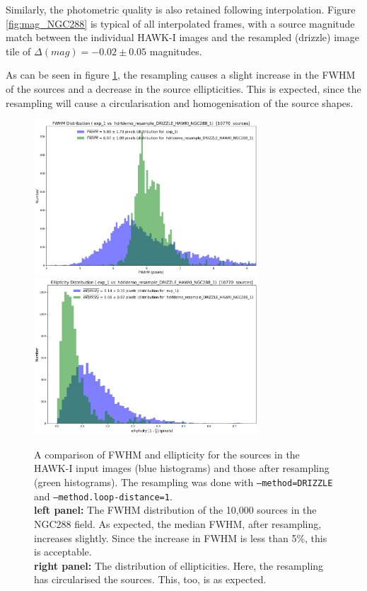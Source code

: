 Similarly, the photometric quality is also retained following interpolation.   Figure \ref{fig:mag_NGC288} is typical of all interpolated frames, with a source magnitude match 
between the individual HAWK-I images and the resampled (drizzle) image tile of $\Delta(mag)=-0.02\pm0.05$ magnitudes.

As can be seen in figure \ref{fig:fwhm_ellip_NGC288}, the resampling causes a slight increase in the FWHM of the sources and a decrease in the source ellipticities.
This is expected, since the resampling will cause a circularisation and homogenisation of the source shapes.


\begin{figure}[H]
\centering
\includegraphics[width=8.4cm]{figures/match_field_DRIZZLE_HAWKI_NGC288_1_FWHM_histogram.png}
\includegraphics[width=8.4cm]{figures/match_field_DRIZZLE_HAWKI_NGC288_1_ellipticity_histogram.png} 
\caption[]
	{\footnotesize  A comparison of FWHM and ellipticity for the sources in the HAWK-I input images (blue histograms) and those
	after resampling (green histograms).  The resampling was done with {\tt --method=DRIZZLE} and {\tt --method.loop-distance=1}.\\
	{\bf left panel:}    The FWHM distribution of the 10,000 sources in the NGC288 field. As expected, the median FWHM, after resampling, increases slightly.  
	                           Since the increase in FWHM is less than 5\%, this is acceptable.\\
	{\bf right panel:} The distribution of ellipticities.   Here, the resampling has circularised the sources.   This, too, is as expected. 
	}
	\label{fig:fwhm_ellip_NGC288}
\end{figure}



